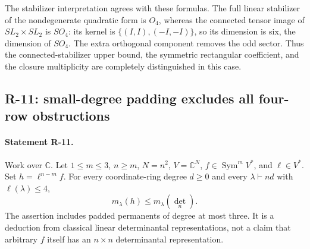 \documentclass[11pt,a4paper]{article}
\theoremstyle{definition}\newtheorem{definition}{Definition}
\begin{document}
The stabilizer interpretation agrees with these formulas.
The full linear stabilizer of the nondegenerate quadratic form is
$O_4$, whereas the connected tensor image of $SL_2\times SL_2$ is
$SO_4$: its kernel is $\{(I,I),(-I,-I)\}$, so its dimension is six,
the dimension of $SO_4$. The extra orthogonal component removes
the odd sector. Thus the connected-stabilizer upper bound, the
symmetric rectangular coefficient, and the closure multiplicity
are completely distinguished in this case.

\subsection{R-11: small-degree padding excludes all four-row obstructions}

\paragraph{Statement R-11.}
Work over $\mathbb C$. Let $1\leq m\leq3$, $n\geq m$, $N=n^2$,
$V=\mathbb C^N$, $f\in\operatorname{Sym}^mV^*$, and $\ell\in V^*$.
Set $h=\ell^{n-m}f$. For every coordinate-ring degree $d\geq0$
and every $\lambda\vdash nd$ with $\ell(\lambda)\leq4$,
\begin{equation}\label{R11:fourrow}
 m_\lambda(h)\leq m_\lambda(\det_n).
\end{equation}
The assertion includes padded permanents of degree at most three.
It is a deduction from classical linear determinantal
representations, not a claim that arbitrary $f$ itself has an
$n\times n$ determinantal representation.
\end{document}
